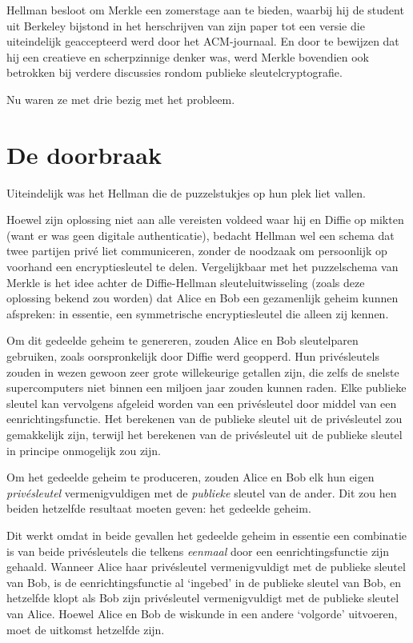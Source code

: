 \documentclass[
  a5paper,
  smalldemyvopaper,11pt,twoside,onecolumn,openright,extrafontsizes]{memoir}
\begin{document}
Hellman besloot om Merkle een zomerstage aan te bieden, waarbij hij de
student uit Berkeley bijstond in het herschrijven van zijn paper tot een
versie die uiteindelijk geaccepteerd werd door het ACM-journaal. En door
te bewijzen dat hij een creatieve en scherpzinnige denker was, werd
Merkle bovendien ook betrokken bij verdere discussies rondom publieke
sleutelcryptografie.

Nu waren ze met drie bezig met het probleem.

\section{De doorbraak}\label{de-doorbraak}

Uiteindelijk was het Hellman die de puzzelstukjes op hun plek liet
vallen.

Hoewel zijn oplossing niet aan alle vereisten voldeed waar hij en Diffie
op mikten (want er was geen digitale authenticatie), bedacht Hellman wel
een schema dat twee partijen privé liet communiceren, zonder de noodzaak
om persoonlijk op voorhand een encryptiesleutel te delen. Vergelijkbaar
met het puzzelschema van Merkle is het idee achter de Diffie-Hellman
sleuteluitwisseling (zoals deze oplossing bekend zou worden) dat Alice
en Bob een gezamenlijk geheim kunnen afspreken: in essentie, een
symmetrische encryptiesleutel die alleen zij kennen.

Om dit gedeelde geheim te genereren, zouden Alice en Bob sleutelparen
gebruiken, zoals oorspronkelijk door Diffie werd geopperd. Hun
privésleutels zouden in wezen gewoon zeer grote willekeurige getallen
zijn, die zelfs de snelste supercomputers niet binnen een miljoen jaar
zouden kunnen raden. Elke publieke sleutel kan vervolgens afgeleid
worden van een privésleutel door middel van een eenrichtingsfunctie. Het
berekenen van de publieke sleutel uit de privésleutel zou gemakkelijk
zijn, terwijl het berekenen van de privésleutel uit de publieke sleutel
in principe onmogelijk zou zijn.

Om het gedeelde geheim te produceren, zouden Alice en Bob elk hun eigen
\emph{privésleutel} vermenigvuldigen met de \emph{publieke} sleutel van
de ander. Dit zou hen beiden hetzelfde resultaat moeten geven: het
gedeelde geheim.

Dit werkt omdat in beide gevallen het gedeelde geheim in essentie een
combinatie is van beide privésleutels die telkens \emph{eenmaal} door
een eenrichtingsfunctie zijn gehaald. Wanneer Alice haar privésleutel
vermenigvuldigt met de publieke sleutel van Bob, is de
eenrichtingsfunctie al `ingebed' in de publieke sleutel van Bob, en
hetzelfde klopt als Bob zijn privésleutel vermenigvuldigt met de
publieke sleutel van Alice. Hoewel Alice en Bob de wiskunde in een
andere `volgorde' uitvoeren, moet de uitkomst hetzelfde zijn.
\end{document}

